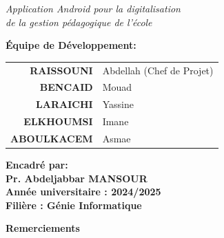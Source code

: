 \documentclass[12pt,a4paper]{report}
\begin{document}
\begin{titlepage}
{    {\normalsize\itshape\color{grisENSA}Application Android pour la digitalisation\\[0.1cm]
    de la gestion pédagogique de l'école}

    \vspace{1.5cm}

    \begin{flushright}
        {\large\bfseries\color{bleuENSA!80!black}Équipe de Développement:}\\[0.3cm]
        \begin{tabular}{r@{\hspace{0.4cm}}l}
            \textbf{RAISSOUNI} & Abdellah (Chef de Projet) \\[0.1cm]
            \textbf{BENCAID} & Mouad \\[0.1cm]
            \textbf{LARAICHI} & Yassine \\[0.1cm]
            \textbf{ELKHOUMSI} & Imane \\[0.1cm]
            \textbf{ABOULKACEM} & Asmae \\
        \end{tabular}
    \end{flushright}

    \vspace{1.0cm}

    \begin{flushright}
        {\large\bfseries\color{bleuENSA!80!black}Encadré par:}\\[0.2cm]
        {\large\bfseries Pr. Abdeljabbar MANSOUR}\\[0.6cm]
        
        {\normalsize\bfseries Année universitaire : 2024/2025}\\[0.2cm]
        {\normalsize\bfseries Filière : Génie Informatique}
    \end{flushright}

    \vspace*{0.5cm}
    }%
\end{titlepage}

\newpage
\thispagestyle{empty}
\vspace*{5cm}
\begin{center}
    {\huge\bfseries Remerciements}
\end{center}

\vspace{2cm}
\end{document}
